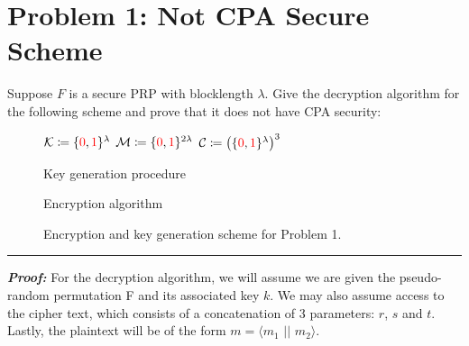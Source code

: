 \section{Problem 1: Not CPA Secure Scheme}\label{sec:problem1}

Suppose $F$ is a secure PRP with blocklength $\lambda$.
Give the decryption algorithm for the following scheme and prove that it does not have CPA security:

\begin{figure}[h!]
    \centering
\begin{minipage}[t]{.45\textwidth}
\null 
 \begin{algorithm}[H]
    \DontPrintSemicolon
    $\mathcal{K} \coloneqq \{\textcolor{red}{0}, \textcolor{red}{1}\}^{\lambda}$ \;
    $\mathcal{M} \coloneqq \{ \textcolor{red}{0} , \textcolor{red}{1} \}^{2\lambda}$ \;
    $\mathcal{C} \coloneqq \left( \{ \textcolor{red}{0} , \textcolor{red}{1} \}^{\lambda}\right)^3$ \;
    \caption{Key generation procedure}
  \end{algorithm}
\end{minipage}%
\begin{minipage}[t]{.45\textwidth}
\null
 \begin{algorithm}[H]
    \DontPrintSemicolon
     \vspace{4.4pt}
    \caption{Encryption algorithm}
  \end{algorithm}
\end{minipage}
    \caption{Encryption and key generation scheme for Problem 1.\label{prob1:encryption}}
\end{figure}
\begin{center}
    \rule{5cm}{0.4pt}
\end{center}

\textbf{\textit{Proof:}}
For the decryption algorithm, we will assume we are given the pseudo-random permutation F and its associated key $k$.
We may also assume access to the cipher text, which consists of a concatenation of 3 parameters: $r$, $s$ and $t$.
Lastly, the plaintext will be of the form $m = \langle m_1$ $\vert \vert$ $m_2 \rangle$.

